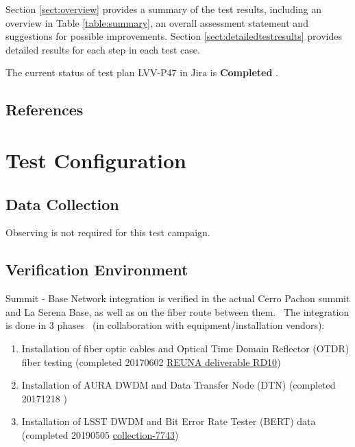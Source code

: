 \documentclass[DM,STR,toc]{lsstdoc}
\providecommand{\tightlist}{
  \setlength{\itemsep}{0pt}\setlength{\parskip}{0pt}}
\begin{document}
Section \ref{sect:overview} provides a summary of the test results, including an overview in Table \ref{table:summary}, an overall assessment statement and suggestions for possible improvements.
Section \ref{sect:detailedtestresults} provides detailed results for each step in each test case.

The current status of test plan LVV-P47 in Jira is \textbf{ Completed }.

\subsection{References}
\label{sect:references}
\renewcommand{\refname}{}

\section{Test Configuration}
\label{sect:configuration}

\subsection{Data Collection}

  Observing is not required for this test campaign.

\subsection{Verification Environment}
\label{sect:hwconf}
  Summit - Base Network integration is verified in the actual Cerro Pachon
summit and La Serena Base, as well as on the fiber route between them.
~The integration is done in 3 phases ~(in collaboration with
equipment/installation vendors):

\begin{enumerate}
\tightlist
\item
  Installation of fiber optic cables and Optical Time Domain Reflector
  (OTDR) fiber testing (completed 20170602
  \href{https://docushare.lsstcorp.org/docushare/dsweb/Get/Document-26270/RD10\%20Report\%20of\%20delivery\%20of\%20LS\%20-\%20AG\%20fiber\%20from\%20Telefonica\%20to\%20REUNA.pdf}{REUNA
  deliverable RD10})
\item
  Installation of AURA DWDM and Data Transfer Node (DTN) (completed
  20171218 )
\item
  Installation of LSST DWDM and Bit Error Rate Tester (BERT) data
  (completed 20190505
  \href{https://docushare.lsstcorp.org/docushare/dsweb/View/Collection-7743}{collection-7743})
\end{enumerate}
\end{document}
